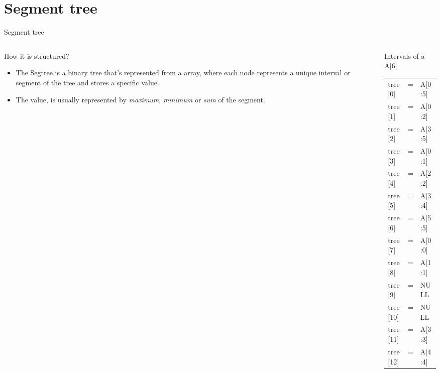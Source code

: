 \documentclass[presentation,9pt]{beamer}
\begin{document}
\section{Segment tree}
\label{sec:org6a430e8}
\begin{frame}[label={sec:org7e22879}]{Segment tree}
\begin{columns}
\begin{column}{0.48\columnwidth}
\begin{block}{How it is structured?}
\begin{itemize}
\item The Segtree is a binary tree that's represented from a array, where each node represents a unique interval or segment of the tree and stores a \alert{specific} value.
\item The value, is usually represented by \emph{maximum}, \emph{minimum} or \emph{sum} of the segment.
\end{itemize}
\end{block}
\end{column}
\begin{column}{0.48\columnwidth}
\begin{block}{Intervals of a A[6]}
\begin{center}
\begin{tabular}{lll}
\hline
tree[0] & = & A[0:5]\\
tree[1] & = & A[0:2]\\
tree[2] & = & A[3:5]\\
tree[3] & = & A[0:1]\\
tree[4] & = & A[2:2]\\
tree[5] & = & A[3:4]\\
tree[6] & = & A[5:5]\\
tree[7] & = & A[0:0]\\
tree[8] & = & A[1:1]\\
tree[9] & = & NULL\\
tree[10] & = & NULL\\
tree[11] & = & A[3:3]\\
tree[12] & = & A[4:4]\\
\hline
\end{tabular}
\end{center}
\end{block}
\end{column}
\end{columns}
\end{frame}
\end{document}
